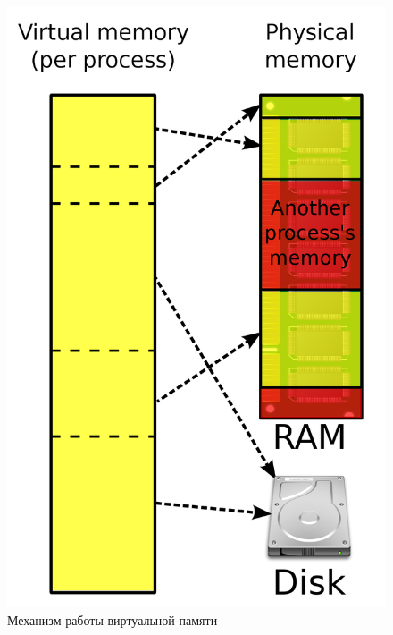 \documentclass[a4paper,11pt]{extarticle}
\begin{document}
	\begin{figure}
		\centering
		\vspace{-10pt}
		
		\includegraphics[width=\linewidth]{../diagrams/virt-mem.png}
		\caption{Механизм работы виртуальной памяти}
		
		\label{fig:virt-mem}
		\vspace{-15pt}
	\end{figure}
	
\end{document}
